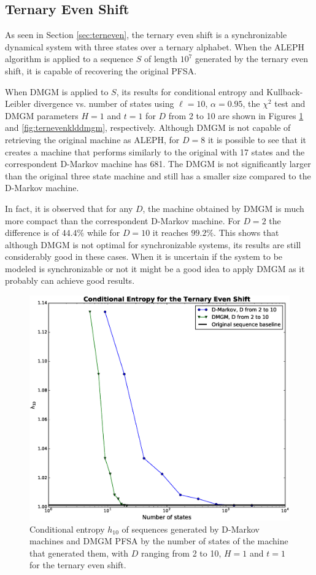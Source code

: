 {\subsection{Ternary Even Shift}

As seen in Section \ref{sec:terneven}, the ternary even shift is a synchronizable dynamical system with three states over a ternary alphabet. When the ALEPH algorithm is applied to a sequence $S$ of length $10^7$ generated by the ternary even shift, it is capable of recovering the original PFSA.

When DMGM is applied to $S$, its results for conditional entropy and Kullback-Leibler divergence vs. number of states using $\ell=10$, $\alpha = 0.95$, the $\chi^2$ test and DMGM parameters $H=1$ and $t=1$ for $D$ from 2 to 10 are shown in Figures \ref{fig:ternevenhdmgm} and \ref{fig:ternevenklddmgm}, respectively. Although DMGM is not capable of retrieving the original machine as ALEPH, for $D = 8$ it is possible to see that it creates a machine that performs similarly to the original with 17 states and the correspondent D-Markov machine has 681. The DMGM is not significantly larger than the original three state machine and still has a smaller size compared to the D-Markov machine.

In fact, it is observed that for any $D$, the machine obtained by DMGM is much more compact than the correspondent D-Markov machine. For $D=2$ the difference is of $44.4\%$ while for $D = 10$ it reaches $99.2\%$. This shows that although DMGM is not optimal for synchronizable systems, its results are still considerably good in these cases. When it is uncertain if the system to be modeled is synchronizable or not it might be a good idea to apply DMGM as it probably can achieve good results.

\begin{figure}[h]
\centering
\includegraphics[scale=0.35]{Figuras/ternaryeven_h_mk4.eps}
\caption{Conditional entropy $h_{10}$ of sequences generated by D-Markov machines and DMGM PFSA by the number of states of the machine that generated them, with $D$ ranging from 2 to 10, $H=1$ and $t=1$ for the ternary even shift.\label{fig:ternevenhdmgm}}
\end{figure}

}
